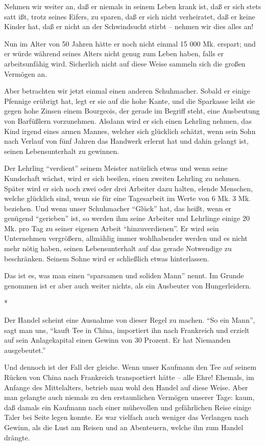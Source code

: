 \documentclass{scrbook}
\begin{document}
Nehmen wir weiter an, daß er niemals in seinem Leben krank ist, daß er sich stets satt ißt, trotz seines Eifers, zu sparen, daß er sich nicht verheiratet, daß er keine Kinder hat, daß er nicht an der Schwindsucht stirbt – nehmen wir dies alles an!

Nun im Alter von 50 Jahren hätte er noch nicht einmal 15 000 Mk. erspart; und er würde während seines Alters nicht genug zum Leben haben, falls er arbeitsunfähig wird. Sicherlich nicht auf diese Weise sammeln sich die großen Vermögen an.

Aber betrachten wir jetzt einmal einen anderen Schuhmacher. Sobald er einige Pfennige erübrigt hat, legt er sie auf die hohe Kante, und die Sparkasse leiht sie gegen hohe Zinsen einem Bourgeois, der gerade im Begriff steht, eine Ausbeutung von Barfüßlern vorzunehmen. Alsdann wird er sich einen Lehrling nehmen, das Kind irgend eines armen Mannes, welcher sich glücklich schätzt, wenn sein Sohn nach Verlauf von fünf Jahren das Handwerk erlernt hat und dahin gelangt ist, seinen Lebensunterhalt zu gewinnen.

Der Lehrling ``verdient'' seinem Meister natürlich etwas und wenn seine Kundschaft wächst, wird er sich beeilen, einen zweiten Lehrling zu nehmen. Später wird er sich noch zwei oder drei Arbeiter dazu halten, elende Menschen, welche glücklich sind, wenn sie für eine Tagesarbeit im Werte von 6 Mk. 3 Mk. beziehen. Und wenn unser Schuhmacher ``Glück'' hat, das heißt, wenn er genügend ``gerieben'' ist, so werden ihm seine Arbeiter und Lehrlinge einige 20 Mk. pro Tag zu seiner eigenen Arbeit ``hinzuverdienen''. Er wird sein Unternehmen vergrößern, allmählig immer wohlhabender werden und es nicht mehr nötig haben, seinen Lebensunterhalt auf das gerade Notwendige zu beschränken. Seinem Sohne wird er schließlich etwas hinterlassen.

Das ist es, was man einen ``sparsamen und soliden Mann'' nennt. Im Grunde genommen ist er aber auch weiter nichts, als ein Ausbeuter von Hungerleidern.

\begin{center}*\end{center}

Der Handel scheint eine Ausnahme von dieser Regel zu machen. ``So ein Mann'', sagt man uns, ``kauft Tee in China, importiert ihn nach Frankreich und erzielt auf sein Anlagekapital einen Gewinn von 30 Prozent. Er hat Niemanden ausgebeutet.''

Und dennoch ist der Fall der gleiche. Wenn unser Kaufmann den Tee auf seinem Rücken von China nach Frankreich transportiert hätte – alle Ehre! Ehemals, im Anfange des Mittelalters, betrieb man wohl den Handel auf diese Weise. Aber man gelangte auch niemals zu den erstaunlichen Vermögen unserer Tage: kaum, daß damals ein Kaufmann nach einer mühevollen und gefährlichen Reise einige Taler bei Seite legen konnte. Es war vielfach auch weniger das Verlangen nach Gewinn, als die Lust am Reisen und an Abenteuern, welche ihn zum Handel drängte.
\end{document}
